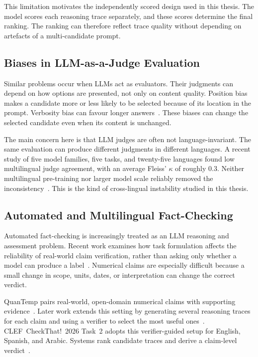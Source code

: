 This limitation motivates the independently scored design used in this thesis.
The model scores each reasoning trace separately, and these scores determine the
final ranking. The ranking can therefore reflect trace quality without depending
on artefacts of a multi-candidate prompt.

\subsection{Biases in LLM-as-a-Judge Evaluation}
\label{subsec:judge-bias}

Similar problems occur when LLMs act as evaluators. Their judgments can depend on
how options are presented, not only on content quality. Position bias makes a
candidate more or less likely to be selected because of its location in the
prompt. Verbosity bias can favour longer answers~\cite{shi2025judgingjudgessystematicstudy}.
These biases can change the selected candidate even when its content is unchanged.

The main concern here is that LLM judges are often not language-invariant. The
same evaluation can produce different judgments in different languages. A recent
study of five model families, five tasks, and twenty-five languages found low
multilingual judge agreement, with an average Fleiss' $\kappa$ of roughly $0.3$.
Neither multilingual pre-training nor larger model scale reliably removed the
inconsistency~\cite{fu2025reliablemultilingualllmasajudge}. This is the kind of
cross-lingual instability studied in this thesis.

\subsection{Automated and Multilingual Fact-Checking}
\label{subsec:factcheck}

Automated fact-checking is increasingly treated as an LLM reasoning and assessment
problem. Recent work examines how task formulation affects the reliability of
real-world claim verification, rather than asking only whether a model can produce
a label~\cite{sahitaj2025automatedfactcheckingrealworldclaims}. Numerical claims
are especially difficult because a small change in scope, units, dates, or
interpretation can change the correct verdict.

QuanTemp pairs real-world, open-domain numerical claims with supporting
evidence~\cite{v2024quantemprealworldopendomainbenchmark}. Later work extends this
setting by generating several reasoning traces for each claim and using a verifier
to select the most useful ones~\cite{chungkham2025thinkrightmoretesttime}.
CLEF~CheckThat!~2026 Task~2 adopts this verifier-guided setup for English,
Spanish, and Arabic. Systems rank candidate traces and derive a claim-level
verdict~\cite{clef-checkthat:2026:task2}.


